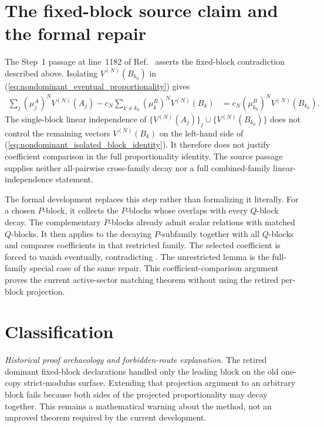 \documentclass{article}
\begin{document}
\section{The fixed-block source claim and the formal repair}

The Step~1 passage at line~1182 of
Ref.~\cite{Cirac2016MPDO_arXiv} asserts the fixed-block contradiction
described above. Isolating $V^{(N)}(B_{k_0})$ in
(\ref{eq:nondominant_eventual_proportionality}) gives
\begin{align}
    \sum_j(\mu^A_j)^N V^{(N)}(A_j)
    -c_N\sum_{k\ne k_0}(\mu^B_k)^N V^{(N)}(B_k)
        &=c_N(\mu^B_{k_0})^N V^{(N)}(B_{k_0}).
    \label{eq:nondominant_isolated_block_identity}
\end{align}
The single-block linear independence of
$\{V^{(N)}(A_j)\}_j\cup\{V^{(N)}(B_{k_0})\}$ does not control the remaining
vectors $V^{(N)}(B_k)$ on the left-hand side of
(\ref{eq:nondominant_isolated_block_identity}). It therefore does not justify
coefficient comparison in the full proportionality identity. The source
passage supplies neither all-pairwise cross-family decay nor a full
combined-family linear-independence statement.

The formal development replaces this step rather than formalizing it literally.
For a chosen $P$-block, it collects the $P$-blocks whose overlaps with every
$Q$-block decay. The complementary $P$-blocks already admit scalar relations
with matched $Q$-blocks. It then applies
 to the decaying
$P$-subfamily together with all $Q$-blocks and compares coefficients in that
restricted family. The selected coefficient is forced to vanish eventually,
contradicting
. The
unrestricted lemma
 is the
full-family special case of the same repair. This coefficient-comparison
argument proves the current active-sector matching theorem without using the
retired per-block projection.

\section{Classification}

\emph{Historical proof archaeology and forbidden-route explanation.} The
retired dominant fixed-block declarations handled only the leading block on the
old one-copy strict-modulus surface. Extending that projection argument to an
arbitrary block fails because both sides of the projected proportionality may
decay together. This remains a mathematical warning about the method, not an
unproved theorem required by the current development.
\end{document}
